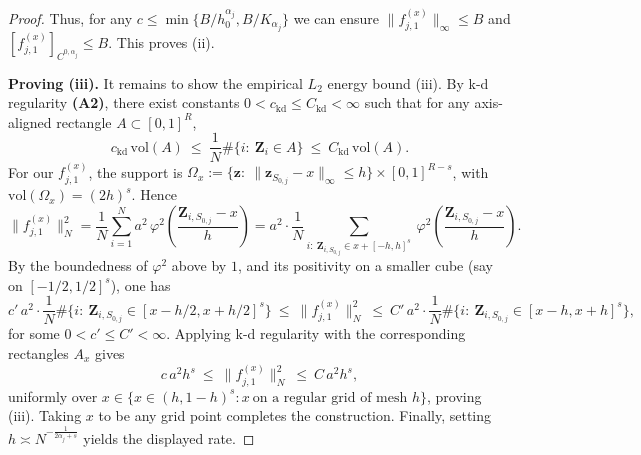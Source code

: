 \documentclass[10pt,a4paper]{amsart}
\begin{document}
\begin{proof}
Thus, for any $c \le \min \{B/h_0 ^{\alpha_j},B/K_{\alpha_j}\}$ we can ensure $\|f_{j,1} ^{(x)}\|_{\infty} \le B$ and $\left[f_{j,1} ^{(x)}\right]_{C^{0,\alpha_j}} \le B.$ This proves (ii).

\textbf{Proving (iii).} It remains to show the empirical $L_2$ energy bound (iii). By k-d regularity \textbf{(A2)}, there exist constants $0<c_\mathrm{kd}\le C_\mathrm{kd}<\infty$ such that for any axis-aligned rectangle $A\subset[0,1]^R$,
\[
c_\mathrm{kd}\,\mathrm{vol}(A)\ \le\ \frac{1}{N}\#\{i:\ \bm Z_i\in A\}\ \le\ C_\mathrm{kd}\,\mathrm{vol}(A).
\]
For our $f_{j,1}^{(x)}$, the support is $\Omega_x:=\{ \bm z:\ \|\bm z_{S_{0,j}}-x\|_\infty\le h\}\times [0,1]^{R-s}$, with $\mathrm{vol}(\Omega_x)= (2h)^s$. Hence
\[
\|f_{j,1}^{(x)}\|_N^2
=\frac{1}{N}\sum_{i=1}^N a^2\,\varphi^2\left(\frac{\bm Z_{i,S_{0,j}}-x}{h}\right)
= a^2 \cdot \frac{1}{N}\sum_{i:\ \bm Z_{i,S_{0,j}}\in x+[-h,h]^s}\ \varphi^2\left(\frac{\bm Z_{i,S_{0,j}}-x}{h}\right).
\]
By the boundedness of $\varphi^2$ above by $1$, and its positivity on a smaller cube (say on $[-1/2,1/2]^s$), one has
\[
c'\,a^2\cdot \frac{1}{N} \#\{i:\ \bm Z_{i,S_{0,j}}\in [x-h/2,x+h/2]^s\}\ \le\ \|f_{j,1}^{(x)}\|_N^2\ \le\ C'\,a^2\cdot \frac{1}{N} \#\{i:\ \bm Z_{i,S_{0,j}}\in [x-h,x+h]^s\},
\]
for some $0<c'\le C'<\infty$. Applying k-d regularity with the corresponding rectangles $A_x$ gives
\[
c\,a^2 h^s\ \le\ \|f_{j,1}^{(x)}\|_N^2\ \le\ C\,a^2 h^s,
\]
uniformly over $x\in \{x\in(h,1-h)^s: x\ \text{on a regular grid of mesh }h\}$, proving (iii). Taking $x$ to be any grid point completes the construction. Finally, setting $h\asymp N^{-\frac{1}{2\alpha_j+s}}$ yields the displayed rate.
\end{proof}
\end{document}
